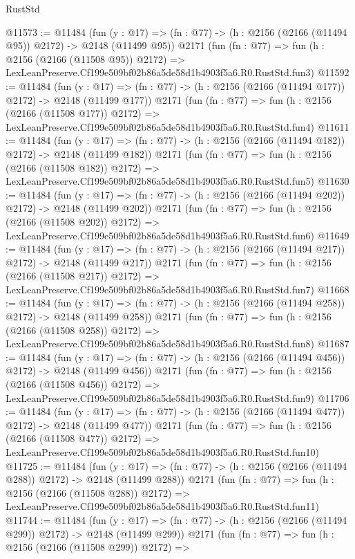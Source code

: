 \begin{lexlean}{RustStd}
\begin{coremodule}
@11573 := @11484
    (fun (y : @17) => (fn : @77) -> (h : @2156 (@2166 (@11494 @95)) @2172) -> @2148 (@11499 @95))
    @2171
    (fun (fn : @77) =>
    fun (h : @2156 (@2166 (@11508 @95)) @2172) =>
    LexLeanPreserve.Cf199e509bf02b86a5de58d1b4903f5a6.R0.RustStd.fun3)
@11592 := @11484
    (fun (y : @17) => (fn : @77) -> (h : @2156 (@2166 (@11494 @177)) @2172) -> @2148 (@11499 @177))
    @2171
    (fun (fn : @77) =>
    fun (h : @2156 (@2166 (@11508 @177)) @2172) =>
    LexLeanPreserve.Cf199e509bf02b86a5de58d1b4903f5a6.R0.RustStd.fun4)
@11611 := @11484
    (fun (y : @17) => (fn : @77) -> (h : @2156 (@2166 (@11494 @182)) @2172) -> @2148 (@11499 @182))
    @2171
    (fun (fn : @77) =>
    fun (h : @2156 (@2166 (@11508 @182)) @2172) =>
    LexLeanPreserve.Cf199e509bf02b86a5de58d1b4903f5a6.R0.RustStd.fun5)
@11630 := @11484
    (fun (y : @17) => (fn : @77) -> (h : @2156 (@2166 (@11494 @202)) @2172) -> @2148 (@11499 @202))
    @2171
    (fun (fn : @77) =>
    fun (h : @2156 (@2166 (@11508 @202)) @2172) =>
    LexLeanPreserve.Cf199e509bf02b86a5de58d1b4903f5a6.R0.RustStd.fun6)
@11649 := @11484
    (fun (y : @17) => (fn : @77) -> (h : @2156 (@2166 (@11494 @217)) @2172) -> @2148 (@11499 @217))
    @2171
    (fun (fn : @77) =>
    fun (h : @2156 (@2166 (@11508 @217)) @2172) =>
    LexLeanPreserve.Cf199e509bf02b86a5de58d1b4903f5a6.R0.RustStd.fun7)
@11668 := @11484
    (fun (y : @17) => (fn : @77) -> (h : @2156 (@2166 (@11494 @258)) @2172) -> @2148 (@11499 @258))
    @2171
    (fun (fn : @77) =>
    fun (h : @2156 (@2166 (@11508 @258)) @2172) =>
    LexLeanPreserve.Cf199e509bf02b86a5de58d1b4903f5a6.R0.RustStd.fun8)
@11687 := @11484
    (fun (y : @17) => (fn : @77) -> (h : @2156 (@2166 (@11494 @456)) @2172) -> @2148 (@11499 @456))
    @2171
    (fun (fn : @77) =>
    fun (h : @2156 (@2166 (@11508 @456)) @2172) =>
    LexLeanPreserve.Cf199e509bf02b86a5de58d1b4903f5a6.R0.RustStd.fun9)
@11706 := @11484
    (fun (y : @17) => (fn : @77) -> (h : @2156 (@2166 (@11494 @477)) @2172) -> @2148 (@11499 @477))
    @2171
    (fun (fn : @77) =>
    fun (h : @2156 (@2166 (@11508 @477)) @2172) =>
    LexLeanPreserve.Cf199e509bf02b86a5de58d1b4903f5a6.R0.RustStd.fun10)
@11725 := @11484
    (fun (y : @17) => (fn : @77) -> (h : @2156 (@2166 (@11494 @288)) @2172) -> @2148 (@11499 @288))
    @2171
    (fun (fn : @77) =>
    fun (h : @2156 (@2166 (@11508 @288)) @2172) =>
    LexLeanPreserve.Cf199e509bf02b86a5de58d1b4903f5a6.R0.RustStd.fun11)
@11744 := @11484
    (fun (y : @17) => (fn : @77) -> (h : @2156 (@2166 (@11494 @299)) @2172) -> @2148 (@11499 @299))
    @2171
    (fun (fn : @77) =>
    fun (h : @2156 (@2166 (@11508 @299)) @2172) =>

\end{coremodule}
\end{lexlean}
